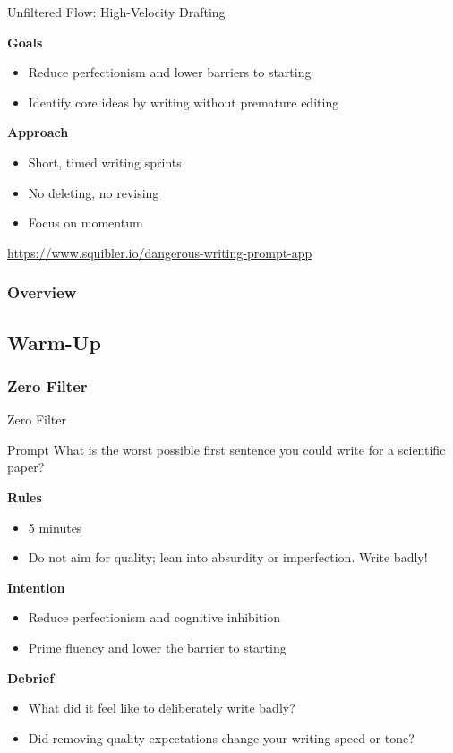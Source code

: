 \documentclass{beamer}
\begin{document}
\begin{frame}{Unfiltered Flow: High-Velocity Drafting}



\textbf{Goals}
\begin{itemize}
    \item Reduce perfectionism and lower barriers to starting
    \item Identify core ideas by writing without premature editing
\end{itemize}

\textbf{Approach}
\begin{itemize}
    \item Short, timed writing sprints
    \item No deleting, no revising
    \item Focus on momentum
\end{itemize}

\vspace{0.8em}
\url{https://www.squibler.io/dangerous-writing-prompt-app}


\end{frame}

  \begin{frame}
    \frametitle{Overview}
    \tableofcontents
  \end{frame}

\subsection{Warm-Up}

\subsubsection{Zero Filter}

\begin{frame}{Zero Filter}
\begin{block}{Prompt}
What is the worst possible first sentence you could write for a scientific paper?
\end{block}

\vspace{0.8em}
\textbf{Rules}
\begin{itemize}
    \item 5 minutes
    \item Do not aim for quality; lean into absurdity or imperfection.  Write badly!

\end{itemize}

\textbf{Intention}
\begin{itemize}
    \item Reduce perfectionism and cognitive inhibition
    \item Prime fluency and lower the barrier to starting
\end{itemize}

\textbf{Debrief}
\begin{itemize}
    \item What did it feel like to deliberately write badly?
    \item Did removing quality expectations change your writing speed or tone?
\end{itemize}
\end{frame}
\end{document}
